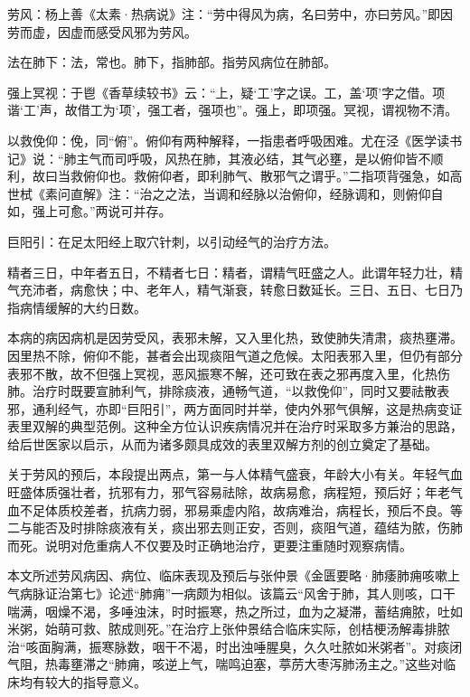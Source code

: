 \documentclass[draft,12pt]{ctexbook}
\begin{document}

\begin{jiaozhu}
	\item 劳风：杨上善《太素·热病说》注：“劳中得风为病，名曰劳中，亦曰劳风。”即因劳而虚，因虚而感受风邪为劳风。
	\item 法在肺下：法，常也。肺下，指肺部。指劳风病位在肺部。
	\item 强上冥视：于鬯《香草续较书》云：“上，疑‘工’字之误。工，盖‘项’字之借。项谐‘工’声，故借工为‘项’，强工者，强项也”。强上，即项强。冥视，谓视物不清。
	\item 以救俛仰：俛，同“俯”。俯仰有两种解释，一指患者呼吸困难。尤在泾《医学读书记》说：“肺主气而司呼吸，风热在肺，其液必结，其气必壅，是以俯仰皆不顺利，故曰当救俯仰也。救俯仰者，即利肺气、散邪气之谓乎。”二指项背强急，如高世栻《素问直解》注：“治之之法，当调和经脉以治俯仰，经脉调和，则俯仰自如，强上可愈。”两说可并存。
	\item 巨阳引：在足太阳经上取穴针刺，以引动经气的治疗方法。
	\item 精者三日，中年者五日，不精者七日：精者，谓精气旺盛之人。此谓年轻力壮，精气充沛者，病愈快；中、老年人，精气渐衰，转愈日数延长。三日、五日、七日乃指病情缓解的大约日数。
\end{jiaozhu}



本病的病因病机是因劳受风，表邪未解，又入里化热，致使肺失清肃，痰热壅滞。因里热不除，俯仰不能，甚者会出现痰阻气道之危候。太阳表邪入里，但仍有部分表邪不散，故不但强上冥视，恶风振寒不解，还可致在表之邪再度入里，化热伤肺。治疗时既要宣肺利气，排除痰液，通畅气道，“以救俛仰”，同时又要祛散表邪，通利经气，亦即“巨阳引”，两方面同时并举，使内外邪气俱解，这是热病变证表里双解的典型范例。这种全方位认识疾病情况并在治疗时采取多方兼治的思路，给后世医家以启示，从而为诸多颇具成效的表里双解方剂的创立奠定了基础。

关于劳风的预后，本段提出两点，第一与人体精气盛衰，年龄大小有关。年轻气血旺盛体质强壮者，抗邪有力，邪气容易祛除，故病易愈，病程短，预后好；年老气血不足体质校差者，抗病力弱，邪易乘虚内陷，故病难治，病程长，预后不良。等二与能否及时排除痰液有关，痰出邪去则正安，否则，痰阻气道，蕴结为脓，伤肺而死。说明对危重病人不仅要及时正确地治疗，更要注重随时观察病情。


本文所述劳风病因、病位、临床表现及预后与张仲景《金匮要略·肺痿肺痈咳嗽上气病脉证治第七》论述“肺痈”一病颇为相似。该篇云“风舍于肺，其人则咳，口干喘满，咽燥不渴，多唾浊沫，时时振寒，热之所过，血为之凝滞，蓄结痈脓，吐如米粥，始萌可救、脓成则死。”在治疗上张仲景结合临床实际，创桔梗汤解毒排脓治“咳面胸满，振寒脉数，咽干不渴，时出浊唾腥臭，久久吐脓如米粥者”。对痰闭气阻，热毒壅滞之“肺痈，咳逆上气，喘鸣迫塞，葶苈大枣泻肺汤主之。”这些对临床均有较大的指导意义。
\end{document}
